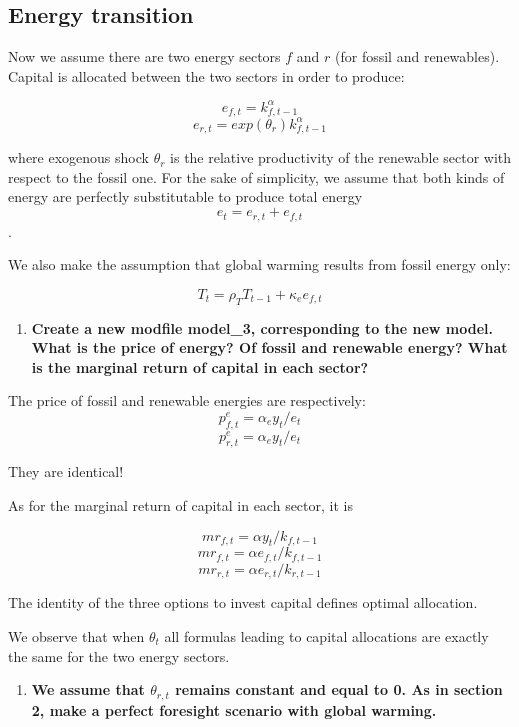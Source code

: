 \documentclass[
  letterpaper,
  DIV=11,
  numbers=noendperiod]{scrartcl}
\providecommand{\tightlist}{%
  \setlength{\itemsep}{0pt}\setlength{\parskip}{0pt}}\usepackage{longtable,booktabs,array}
\begin{document}
\hypertarget{energy-transition}{%
\subsection{Energy transition}\label{energy-transition}}

Now we assume there are two energy sectors \(f\) and \(r\) (for fossil
and renewables). Capital is allocated between the two sectors in order
to produce:

\[e_{f,t} = k_{f,t-1}^{\alpha}\]
\[e_{r,t} = exp(\theta_r) k_{f,t-1}^{\alpha}\]

where exogenous shock \(\theta_r\) is the relative productivity of the
renewable sector with respect to the fossil one. For the sake of
simplicity, we assume that both kinds of energy are perfectly
substitutable to produce total energy \[e_t=e_{r,t}+e_{f,t}\].

We also make the assumption that global warming results from fossil
energy only:

\[T_t = \rho_T T_{t-1} +  \kappa_{e}  e_{f,t}\]

\begin{enumerate}
\def\labelenumi{\arabic{enumi}.}
\setcounter{enumi}{11}
\tightlist
\item
  \textbf{Create a new modfile model\_3, corresponding to the new model.
  What is the price of energy? Of fossil and renewable energy? What is
  the marginal return of capital in each sector?}
\end{enumerate}

The price of fossil and renewable energies are respectively:
\[p^e_{f,t} = \alpha_e y_t / e_t\] \[p^e_{r,t} = \alpha_e y_t / e_t\]

They are identical!

As for the marginal return of capital in each sector, it is

\[mr_{f,t} = \alpha y_t / k_{f,t-1}\]
\[mr_{f,t} = \alpha e_{f,t} / k_{f,t-1}\]
\[mr_{r,t} = \alpha e_{r,t} / k_{r,t-1}\]

The identity of the three options to invest capital defines optimal
allocation.

We observe that when \(\theta_t\) all formulas leading to capital
allocations are exactly the same for the two energy sectors.

\begin{enumerate}
\def\labelenumi{\arabic{enumi}.}
\setcounter{enumi}{12}
\tightlist
\item
  \textbf{We assume that \(\theta_{r,t}\) remains constant and equal to
  0. As in section 2, make a perfect foresight scenario with global
  warming.}
\end{enumerate}
\end{document}
